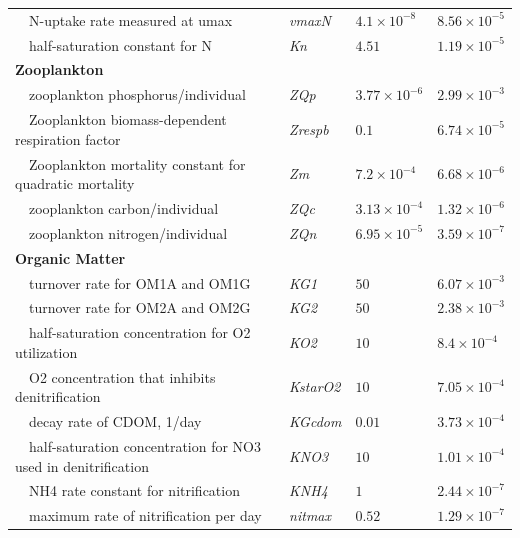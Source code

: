 \documentclass[letterpaper,12pt,oneside]{article}\usepackage[]{graphicx}\usepackage[]{color}
\begin{document}
\begin{table}[!tbp]
{\begin{center}
\begin{tabular}{llll}
~~N-uptake rate measured at umax&\textit{vmaxN}&$4.1\times 10^{-8}$&$8.56\times 10^{-5}$\tabularnewline
~~half-saturation constant for N&\textit{Kn}&$4.51$&$1.19\times 10^{-5}$\tabularnewline
\hline
{\bfseries Zooplankton}&&&\tabularnewline
~~zooplankton phosphorus/individual&\textit{ZQp}&$3.77\times 10^{-6}$&$2.99\times 10^{-3}$\tabularnewline
~~Zooplankton biomass-dependent respiration factor&\textit{Zrespb}&$0.1$&$6.74\times 10^{-5}$\tabularnewline
~~Zooplankton mortality constant for quadratic mortality&\textit{Zm}&$7.2\times 10^{-4}$&$6.68\times 10^{-6}$\tabularnewline
~~zooplankton carbon/individual&\textit{ZQc}&$3.13\times 10^{-4}$&$1.32\times 10^{-6}$\tabularnewline
~~zooplankton nitrogen/individual&\textit{ZQn}&$6.95\times 10^{-5}$&$3.59\times 10^{-7}$\tabularnewline
\hline
{\bfseries Organic Matter}&&&\tabularnewline
~~turnover rate for OM1A and OM1G&\textit{KG1}&$50$&$6.07\times 10^{-3}$\tabularnewline
~~turnover rate for OM2A and OM2G&\textit{KG2}&$50$&$2.38\times 10^{-3}$\tabularnewline
~~half-saturation concentration for O2 utilization&\textit{KO2}&$10$&$8.4\times 10^{-4}$\tabularnewline
~~O2 concentration that inhibits denitrification&\textit{KstarO2}&$10$&$7.05\times 10^{-4}$\tabularnewline
~~decay rate of CDOM, 1/day&\textit{KGcdom}&$0.01$&$3.73\times 10^{-4}$\tabularnewline
~~half-saturation concentration for NO3 used in denitrification&\textit{KNO3}&$10$&$1.01\times 10^{-4}$\tabularnewline
~~NH4 rate constant for nitrification&\textit{KNH4}&$1$&$2.44\times 10^{-7}$\tabularnewline
~~maximum rate of nitrification per day&\textit{nitmax}&$0.52$&$1.29\times 10^{-7}$\tabularnewline
\hline
\end{tabular}\end{center}}

\end{table}


\end{document}
